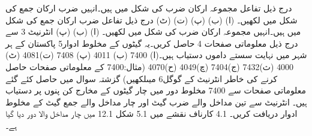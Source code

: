 درج ذیل تفاعل مجموعہ ارکان ضرب کی شکل میں ہیں۔انہیں ضرب ارکان جمع کی شکل میں لکھیں۔
(ا)	       (ب)  		
(پ)  (ت)  
(ٹ) 
	درج ذیل تفاعل ضرب ارکان جمع کی شکل میں ہیں۔انہیں مجموعہ ارکان ضرب کی شکل میں لکھیں۔
(ا)	(ب)			
(پ)	
	انٹرنیٹ 3 سے درج ذیل معلوماتی صفحات 4 حاصل کریں۔یہ گیٹوں کے مخلوط ادوار5  پاکستان کے ہر شہر میں نہایت سستے داموں دستیاب ہیں۔(ا) 7400 (ب) 4011 (پ) 7408 (ت)4081 (ٹ) 4000 (ث)7432 (ج)7404 (چ)4049 (ح)4070  (مثال:7400 کے معلوماتی صفحات حاصل کرنے کی خاطر انٹرنیٹ کے گوگل6 میںلکھیں)
	گزشتہ سوال میں حاصل کئے گئے معلوماتی صفحات سے 7400 مخلوط دور میں چار گیٹوں کے مخارج کن پنوں پر دستیاب ہیں۔
	انٹرنیٹ سے تین مداخل والے ضرب گیٹ اور چار مداخل والے جمع گیٹ کے مخلوط ادوار دریافت کریں۔
4.1	کارناف نقشے میں
5.1	شکل 12.1 میں چار مداخل والا دور دیا گیا ہے۔

